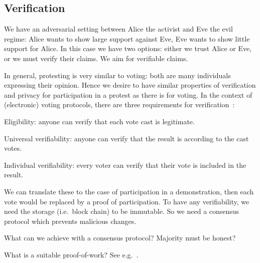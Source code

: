 \subsection{Verification}
\label{Verification}

We have an adversarial setting between Alice the activist and Eve the evil 
regime: Alice wants to show large support against Eve, Eve wants to show little
support for Alice.
In this case we have two options:
either we trust Alice or Eve, or we must verify their claims.
We aim for verifiable claims.

In general, protesting is very similar to voting: both are many individuals 
expressing their opinion.
Hence we desire to have similar properties of verification and privacy for 
participation in a protest as there is for voting.
In the context of (electronic) voting protocols, there are three requirements 
for verification~\cite{VerifyingPrivacyPropertiesOfVotingProtocols}:
\begin{frame}
\begin{requirements}[V]
\item\label{EligibilityVerif} Eligibility: anyone can verify that each vote 
  cast is legitimate.
\item\label{UniversalVerif} Universal verifiability: anyone can verify that the 
  result is according to the cast votes.
\item\label{IndividualVerif} Individual verifiability: every voter can verify 
  that their vote is included in the result.
\end{requirements}
\end{frame}
We can translate these to the case of participation in a demonstration, then 
each vote would be replaced by a proof of participation.
To have any verifiability, we need the storage (i.e.\ block chain) to be 
immutable.
So we need a consensus protocol which prevents malicious changes.

\begin{frame}

  \begin{question}
    What can we achieve with a consensus protocol?
    Majority must be honest?
  \end{question}
  \begin{question}
    What is a suitable proof-of-work?
    See e.g.~\cite{FairProofOfWork}.
  \end{question}
\end{frame}

